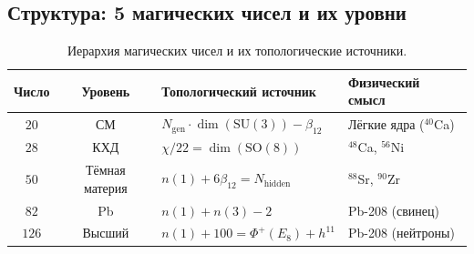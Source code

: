 \documentclass[11pt,a4paper]{article}
\newcommand{\SU}{\mathrm{SU}}
\newcommand{\SO}{\mathrm{SO}}
\newcommand{\Ngen}{N_{\text{gen}}}
\newcommand{\Nhidden}{N_{\text{hidden}}}
\theoremstyle{definition}
\begin{document}
\subsection{Структура: 5 магических чисел и их уровни}
\label{subsec:magic-levels}

\begin{table}[htbp]
\centering
\caption{Иерархия магических чисел и их топологические источники.}
\label{tab:magic-levels}
\begin{tabular}{ccll}
\toprule
Число & Уровень & Топологический источник & Физический смысл \\
\midrule
$20$ & СМ & $\Ngen \cdot \dim(\SU(3)) - \beta_{12}$ & 
    Лёгкие ядра ($^{40}$Ca) \\[0.3em]
$28$ & КХД & $\chi / 22 = \dim(\SO(8))$ & 
    $^{48}$Ca, $^{56}$Ni \\[0.3em]
$50$ & Тёмная материя & $n(1) + 6\beta_{12} = \Nhidden$ & 
    $^{88}$Sr, $^{90}$Zr \\[0.3em]
$82$ & Pb & $n(1) + n(3) - 2$ & 
    Pb-208 (свинец) \\[0.3em]
$126$ & Высший & $n(1) + 100 = \Phi^+(E_8) + h^{11}$ & 
    Pb-208 (нейтроны) \\
\bottomrule
\end{tabular}
\end{table}
\end{document}

